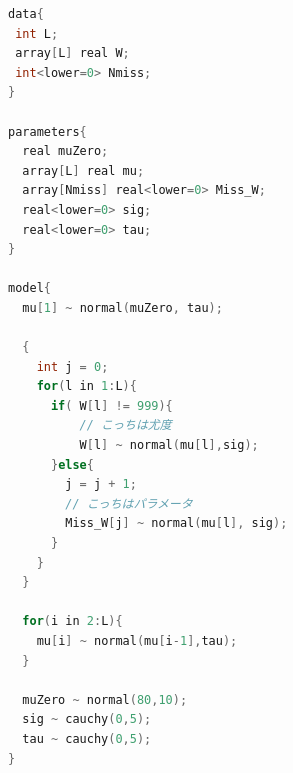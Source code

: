 \begin{lstlisting}[language=c++,label={stan::29_02},caption={欠損値補間のコード}]
data{
 int L;
 array[L] real W;
 int<lower=0> Nmiss;
}

parameters{
  real muZero;
  array[L] real mu;
  array[Nmiss] real<lower=0> Miss_W;
  real<lower=0> sig;
  real<lower=0> tau;
}

model{
  mu[1] ~ normal(muZero, tau);
  
  {
    int j = 0;
    for(l in 1:L){
      if( W[l] != 999){
          // こっちは尤度
          W[l] ~ normal(mu[l],sig);
      }else{
        j = j + 1;
        // こっちはパラメータ
        Miss_W[j] ~ normal(mu[l], sig);
      }
    }
  }
  
  for(i in 2:L){
    mu[i] ~ normal(mu[i-1],tau);
  }
  
  muZero ~ normal(80,10); 
  sig ~ cauchy(0,5);
  tau ~ cauchy(0,5);
}
\end{lstlisting}
